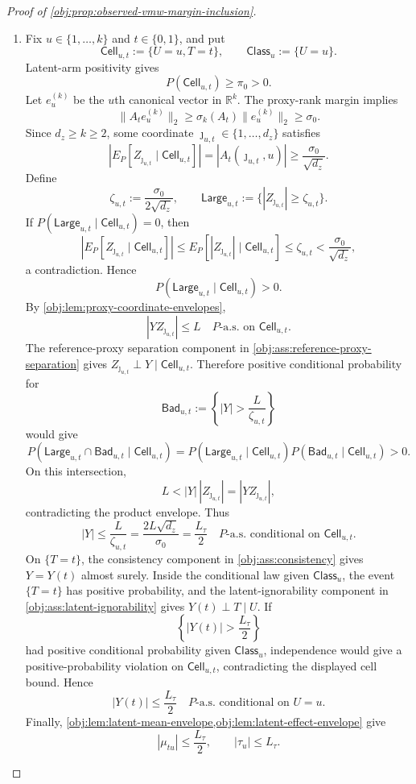 \begin{proof}[Proof of \cref{obj:prop:observed-vmw-margin-inclusion}]
\begin{enumerate}
\item Fix \(u\in\{1,\ldots,k\}\) and \(t\in\{0,1\}\), and put
\[
\mathsf{Cell}_{u,t}:=\{U=u,T=t\},
\qquad
\mathsf{Class}_u:=\{U=u\}.
\]
Latent-arm positivity gives
\[
P(\mathsf{Cell}_{u,t})\ge\pi_0>0.
\]
Let \(e_u^{(k)}\) be the \(u\)th canonical vector in \(\mathbb R^k\).  The proxy-rank margin implies
\[
\|A_te_u^{(k)}\|_2
\ge
\sigma_k(A_t)\|e_u^{(k)}\|_2
\ge
\sigma_0 .
\]
Since \(d_z\ge k\ge2\), some coordinate \(\jmath_{u,t}\in\{1,\ldots,d_z\}\) satisfies
\[
\left|E_P[Z_{\jmath_{u,t}}\mid \mathsf{Cell}_{u,t}]\right|
=
|A_t(\jmath_{u,t},u)|
\ge
\frac{\sigma_0}{\sqrt{d_z}} .
\]
Define
\[
\zeta_{u,t}:=\frac{\sigma_0}{2\sqrt{d_z}},
\qquad
\mathsf{Large}_{u,t}:=\{|Z_{\jmath_{u,t}}|\ge \zeta_{u,t}\}.
\]
If \(P(\mathsf{Large}_{u,t}\mid\mathsf{Cell}_{u,t})=0\), then
\[
\left|E_P[Z_{\jmath_{u,t}}\mid \mathsf{Cell}_{u,t}]\right|
\le
E_P[|Z_{\jmath_{u,t}}|\mid \mathsf{Cell}_{u,t}]
\le
\zeta_{u,t}
<
\frac{\sigma_0}{\sqrt{d_z}},
\]
a contradiction.  Hence
\[
P(\mathsf{Large}_{u,t}\mid\mathsf{Cell}_{u,t})>0 .
\]
By \cref{obj:lem:proxy-coordinate-envelopes},
\[
|YZ_{\jmath_{u,t}}|\le L
\quad P\text{-a.s. on }\mathsf{Cell}_{u,t}.
\]
The reference-proxy separation component in \cref{obj:ass:reference-proxy-separation} gives \(Z_{\jmath_{u,t}}\perp Y\mid \mathsf{Cell}_{u,t}\).  Therefore positive conditional probability for
\[
\mathsf{Bad}_{u,t}:=
\left\{|Y|>\frac{L}{\zeta_{u,t}}\right\}
\]
would give
\[
P(\mathsf{Large}_{u,t}\cap\mathsf{Bad}_{u,t}\mid\mathsf{Cell}_{u,t})
=
P(\mathsf{Large}_{u,t}\mid\mathsf{Cell}_{u,t})
P(\mathsf{Bad}_{u,t}\mid\mathsf{Cell}_{u,t})
>0.
\]
On this intersection,
\[
L<|Y|\,|Z_{\jmath_{u,t}}|=|YZ_{\jmath_{u,t}}|,
\]
contradicting the product envelope.  Thus
\[
|Y|
\le
\frac{L}{\zeta_{u,t}}
=
\frac{2L\sqrt{d_z}}{\sigma_0}
=
\frac{L_\tau}{2}
\quad P\text{-a.s. conditional on }\mathsf{Cell}_{u,t}.
\]
On \(\{T=t\}\), the consistency component in \cref{obj:ass:consistency} gives \(Y=Y(t)\) almost surely.  Inside the conditional law given \(\mathsf{Class}_u\), the event \(\{T=t\}\) has positive probability, and the latent-ignorability component in \cref{obj:ass:latent-ignorability} gives \(Y(t)\perp T\mid U\).  If
\[
\left\{|Y(t)|>\frac{L_\tau}{2}\right\}
\]
had positive conditional probability given \(\mathsf{Class}_u\), independence would give a positive-probability violation on \(\mathsf{Cell}_{u,t}\), contradicting the displayed cell bound.  Hence
\[
|Y(t)|\le\frac{L_\tau}{2}
\quad P\text{-a.s. conditional on }U=u .
\]
Finally, \cref{obj:lem:latent-mean-envelope,obj:lem:latent-effect-envelope} give
\[
|\mu_{tu}|\le \frac{L_\tau}{2},
\qquad
|\tau_u|\le L_\tau .
\]


\end{enumerate}
\end{proof}
